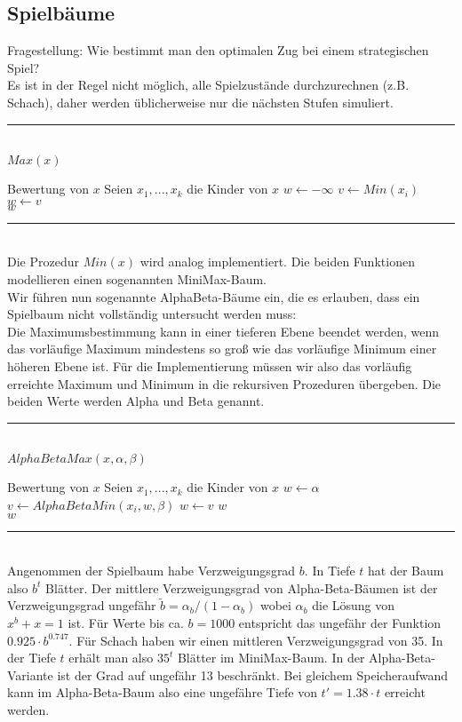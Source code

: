 \documentclass[a4paper, 12pt]{article}
\begin{document}
	\subsection{Spielbäume}
	Fragestellung: Wie bestimmt man den optimalen Zug bei einem strategischen Spiel?\\
	Es ist in der Regel nicht möglich, alle Spielzustände durchzurechnen (z.B. Schach), daher werden üblicherweise nur die nächsten Stufen simuliert.
	\par\noindent\rule{\textwidth}{0.4pt}\\
	\underline{$Max(x)$}
	\begin{algorithmic}[1]
		\Return Bewertung von $x$
		\Else
		\State Seien $x_1,...,x_k$ die Kinder von $x$
		\State $w \gets -\infty$
		\State $v \gets Min(x_i)$
		\State $w \gets v$
		\EndIf
		\EndFor\\
		\Return $w$
		\EndIf
	\end{algorithmic}
	\par\noindent\rule{\textwidth}{0.4pt}\\
	Die Prozedur $Min(x)$ wird analog implementiert.
	Die beiden Funktionen modellieren einen sogenannten MiniMax-Baum.\\
	Wir führen nun sogenannte AlphaBeta-Bäume ein, die es erlauben, dass ein Spielbaum nicht vollständig untersucht werden muss:\\
	
	Die Maximumsbestimmung kann in einer tieferen Ebene beendet werden, wenn das vorläufige Maximum mindestens so groß wie das vorläufige Minimum einer höheren Ebene ist. Für die Implementierung müssen wir also das vorläufig erreichte Maximum und Minimum in die rekursiven Prozeduren übergeben. Die beiden Werte werden Alpha und Beta genannt. 
	\par\noindent\rule{\textwidth}{0.4pt}\\
	\underline{$AlphaBetaMax(x, \alpha, \beta)$}
	\begin{algorithmic}[1]
		\Return Bewertung von $x$
		\Else
		\State Seien $x_1,...,x_k$ die Kinder von $x$
		\State $w \gets \alpha$
		\State $v \gets AlphaBetaMin(x_i, w, \beta)$
		\State $w \gets v$
		\EndIf
		\Return $w$
		\EndIf
		\EndFor\\
		\Return $w$
		\EndIf
	\end{algorithmic}
	\par\noindent\rule{\textwidth}{0.4pt}\\
	Angenommen der Spielbaum habe Verzweigungsgrad $b$. In Tiefe $t$ hat der Baum also $b^t$ Blätter. Der mittlere Verzweigungsgrad von Alpha-Beta-Bäumen ist der Verzweigungsgrad ungefähr $\tilde{b} = \alpha_b/(1-\alpha_b)$ wobei $\alpha_b$ die Lösung von $x^b+x=1$ ist. Für Werte bis ca. $b = 1000$ entspricht das ungefähr der Funktion $0.925\cdot b^{0.747}$. Für Schach haben wir einen mittleren Verzweigungsgrad von 35. In der Tiefe $t$ erhält man also $35^t$ Blätter im MiniMax-Baum. In der Alpha-Beta-Variante ist der Grad auf ungefähr 13 beschränkt. Bei gleichem Speicheraufwand kann im Alpha-Beta-Baum also eine ungefähre Tiefe von $t' = 1.38\cdot t$ erreicht werden.\\
	
\end{document}
